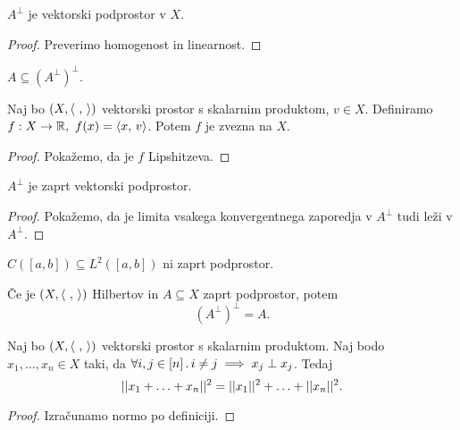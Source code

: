\begin{trditev}
    \(A^\perp\) je vektorski podprostor v \(X\).
\end{trditev}

\begin{proof}
    Preverimo homogenost in linearnost.
\end{proof}

\begin{opomba}
    \(A \subseteq (A^\perp)^\perp\).
\end{opomba}

\begin{trditev}
    Naj bo \((X, \langle \ , \,  \rangle)\) vektorski prostor s skalarnim produktom, \(v \in X\). Definiramo \(f: X \to \mathbb{R}, \ f(x) = \langle x, \, v \rangle\). Potem \(f\) je zvezna na \(X\).
\end{trditev}

\begin{proof}
    Pokažemo, da je \(f\) Lipshitzeva.
\end{proof}

\begin{posledica}
    \(A^\perp\) je zaprt vektorski podprostor.
\end{posledica}

\begin{proof}
    Pokažemo, da je limita vsakega konvergentnega zaporedja v \(A^\perp\) tudi leži v \(A^\perp\).
\end{proof}

\begin{opomba}
    \(C([a, b]) \subseteq L^2([a,b])\) ni zaprt podprostor.
\end{opomba}

\begin{opomba}
    Če je \((X, \langle \ , \,  \rangle)\) Hilbertov in \(A \subseteq X\) zaprt podprostor, potem \[(A^\perp)^\perp = A.\]
\end{opomba}

\begin{trditev}
    \label{trd:pitagor}
    Naj bo \((X, \langle \ , \,  \rangle)\) vektorski prostor s skalarnim produktom. Naj bodo \(x_1, \ldots, x_n \in X\) taki, da \(\forall i, j \in [n] \,.\, i \neq j \implies x_j \perp x_j\). Tedaj 
    \[||x_1 + \ldots + x_n||^2 = ||x_1||^2 + \ldots + ||x_n||^2.\]
\end{trditev}

\begin{proof}
    Izračunamo normo po definiciji.
\end{proof}

